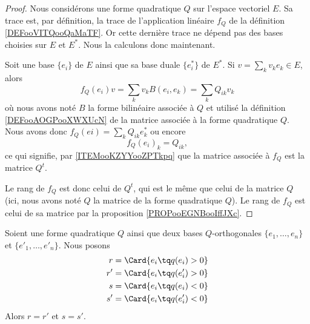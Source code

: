 \begin{proof}
    Nous considérons une forme quadratique \( Q\) sur l'espace vectoriel \( E\). Sa trace est, par définition, la trace de l'application linéaire \( f_Q\) de la définition \ref{DEFooVITQooQaMaTF}. Or cette dernière trace ne dépend pas des bases choisies sur \( E\) et \( E^*\). Nous la calculons donc maintenant.

    Soit une base \( \{ e_i \}\) de \( E\) ainsi que sa base duale \( \{ e_i^* \}\) de \( E^*\). Si \( v=\sum_kv_ke_k\in E\), alors
    \begin{equation}
        f_Q(e_i)v=\sum_kv_kB(e_i,e_k)=\sum_kQ_{ik}v_k
    \end{equation}
    où nous avons noté \( B\) la forme bilinéaire associée à \( Q\) et utilisé la définition \ref{DEFooAOGPooXWXUcN} de la matrice associée à la forme quadratique \( Q\). Nous avons donc \( f_Q(ei)=\sum_kQ_{ik}e_k^*\) ou encore
    \begin{equation}
        f_Q(e_i)_k=Q_{ik},
    \end{equation}
    ce qui signifie, par \ref{ITEMooKZYYooZPTkpq} que la matrice associée à \( f_Q\) est la matrice \( Q^t\).

    Le rang de \( f_Q\) est donc celui de \( Q^t\), qui est le même que celui de la matrice \( Q\) (ici, nous avons noté \( Q\) la matrice de la forme quadratique \( Q\)). Le rang de \( f_Q\) est celui de sa matrice par la proposition \ref{PROPooEGNBooIffJXc}.
\end{proof}


\begin{lemma}     \label{LEMooISHCooVDJEKo}
    Soient une forme quadratique \( Q\) ainsi que deux bases \( Q\)-orthogonales \( \{ e_1,\ldots, e_n \}\) et \( \{ e'_1,\ldots, e'_n \}\). Nous posons
    \begin{subequations}
        \begin{align}
            r&=\Card\{ e_i\tq q(e_i)>0 \}\\
            r'&=\Card\{ e_i\tq q(e'_i)>0 \}\\
            s&=\Card\{ e_i\tq q(e_i)<0 \}\\
            s'&=\Card\{ e_i\tq q(e'_i)<0 \}
        \end{align}
    \end{subequations}
    Alors \( r=r'\) et \( s=s'\).
\end{lemma}

